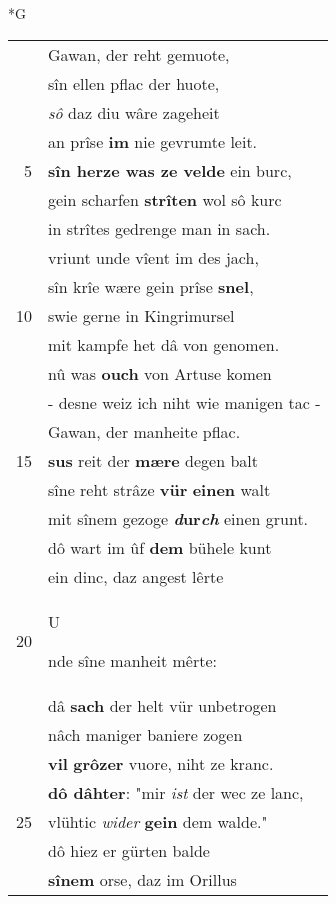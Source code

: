 \documentclass[8pt,a4paper,notitlepage]{article}
\begin{document}
\begin{table}[ht]
\begin{minipage}[t]{0.5\linewidth}
\small
\begin{center}*G
\end{center}
\begin{tabular}{rl}
 & Gawan, der reht gemuote,\\ 
 & sîn ellen pflac der huote,\\ 
 & \textit{sô} daz diu wâre zageheit\\ 
 & an prîse \textbf{im} nie gevrumte leit.\\ 
5 & \textbf{sîn herze was ze velde} ein burc,\\ 
 & gein scharfen \textbf{strîten} wol sô kurc\\ 
 & in strîtes gedrenge man in sach.\\ 
 & vriunt unde vîent im des jach,\\ 
 & sîn krîe wære gein prîse \textbf{snel},\\ 
10 & swie gerne in Kingrimursel\\ 
 & mit kampfe het dâ von genomen.\\ 
 & nû was \textbf{ouch} von Artuse komen\\ 
 & - desne weiz ich niht wie manigen tac -\\ 
 & Gawan, der manheite pflac.\\ 
15 & \textbf{sus} reit der \textbf{mære} degen balt\\ 
 & sîne reht strâze \textbf{vür} \textbf{einen} walt\\ 
 & mit sînem gezoge \textbf{\textit{d}ur\textit{ch}} einen grunt.\\ 
 & dô wart im ûf \textbf{dem} bühele kunt\\ 
 & ein dinc, daz angest lêrte\\ 
20 & \begin{large}U\end{large}nde sîne manheit mêrte:\\ 
 & dâ \textbf{sach} der helt vür unbetrogen\\ 
 & nâch maniger baniere zogen\\ 
 & \textbf{vil} \textbf{grôzer} vuore, niht ze kranc.\\ 
 & \textbf{dô dâhter}: "mir \textit{ist} der wec ze lanc,\\ 
25 & vlühtic \textit{wider} \textbf{gein} dem walde."\\ 
 & dô hiez er gürten balde\\ 
 & \textbf{sînem} orse, daz im Orillus\\ 

\end{tabular}
\end{minipage}
\end{table}
\end{document}

